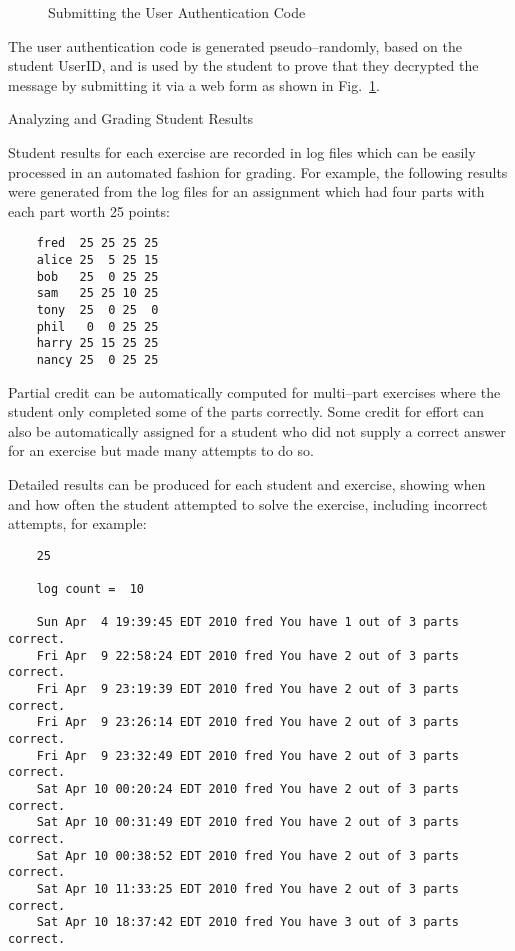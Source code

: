 \documentclass[12pt]{article}
\begin{document}
\begin{figure}[ht]
\begin{center}
\caption{Submitting the User Authentication Code}
\label{fig:UAC}
\end{center}
\end{figure}

The user authentication code 
is generated pseudo--randomly, based on the student UserID, and is used
by the student to prove that they decrypted the message by submitting it
via a web form as shown in Fig.\ \ref{fig:UAC}.

\newpage
Analyzing and Grading Student Results
\vspace{11pt}

Student results for each exercise are recorded in log files which 
can be easily processed in an automated fashion for grading.  
For example, the following results were generated from the log files
for an assignment which had four parts with each part worth 25 points:

\begin{verbatim}
    fred  25 25 25 25
    alice 25  5 25 15
    bob   25  0 25 25
    sam   25 25 10 25
    tony  25  0 25  0
    phil   0  0 25 25
    harry 25 15 25 25
    nancy 25  0 25 25
\end{verbatim}

Partial credit can be automatically computed for multi--part exercises
where the student only completed some of the parts correctly.
Some credit for effort can also be automatically assigned for a student who
did not supply a correct answer for an exercise but made many attempts
to do so.

\vspace{11pt}

Detailed results can be produced for each student and exercise,
showing when and how often the student attempted to solve the exercise,
including incorrect attempts, for example:
\begin{verbatim}
    25

    log count =  10

    Sun Apr  4 19:39:45 EDT 2010 fred You have 1 out of 3 parts correct.
    Fri Apr  9 22:58:24 EDT 2010 fred You have 2 out of 3 parts correct.
    Fri Apr  9 23:19:39 EDT 2010 fred You have 2 out of 3 parts correct.
    Fri Apr  9 23:26:14 EDT 2010 fred You have 2 out of 3 parts correct.
    Fri Apr  9 23:32:49 EDT 2010 fred You have 2 out of 3 parts correct.
    Sat Apr 10 00:20:24 EDT 2010 fred You have 2 out of 3 parts correct.
    Sat Apr 10 00:31:49 EDT 2010 fred You have 2 out of 3 parts correct.
    Sat Apr 10 00:38:52 EDT 2010 fred You have 2 out of 3 parts correct.
    Sat Apr 10 11:33:25 EDT 2010 fred You have 2 out of 3 parts correct.
    Sat Apr 10 18:37:42 EDT 2010 fred You have 3 out of 3 parts correct.
\end{verbatim}
\end{document}
